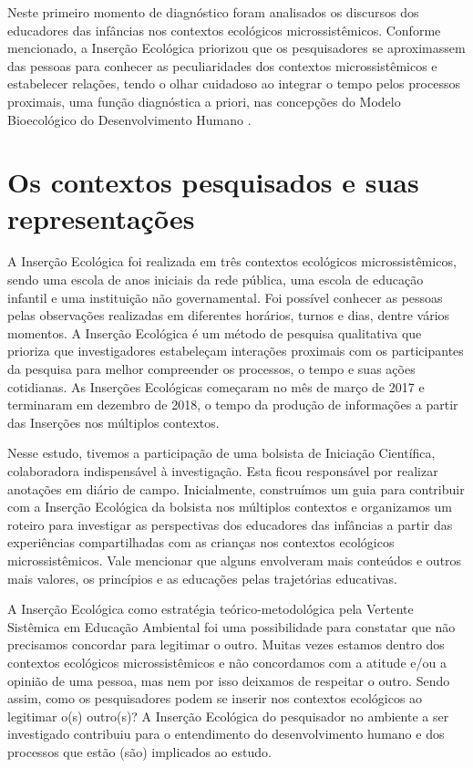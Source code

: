 \documentclass{textolivre-html}
\begin{document}
Neste primeiro momento de diagnóstico foram analisados os discursos dos educadores das infâncias nos contextos ecológicos microssistêmicos. Conforme mencionado, a Inserção Ecológica priorizou que os pesquisadores se aproximassem das pessoas para conhecer as peculiaridades dos contextos microssistêmicos e estabelecer relações, tendo o olhar cuidadoso ao integrar o tempo pelos processos proximais, uma função diagnóstica a priori, nas concepções do Modelo Bioecológico do Desenvolvimento Humano \cite{brofen2011}.



\section{Os contextos pesquisados e suas representações}\label{sec-contextos}
A Inserção Ecológica foi realizada em três contextos ecológicos microssistêmicos, sendo uma escola de anos iniciais da rede pública, uma escola de educação infantil e uma instituição não governamental. Foi possível conhecer as pessoas pelas observações realizadas em diferentes horários, turnos e dias, dentre vários momentos. A Inserção Ecológica \cite{piske2018c,koller2016,silveira2009} é um método de pesquisa qualitativa que prioriza que investigadores estabeleçam interações proximais com os participantes da pesquisa para melhor compreender os processos, o tempo e suas ações cotidianas. As Inserções Ecológicas começaram no mês de março de 2017 e terminaram em dezembro de 2018, o tempo da produção de informações a partir das Inserções nos múltiplos contextos.

Nesse estudo, tivemos a participação de uma bolsista de Iniciação Científica, colaboradora indispensável à investigação. Esta ficou responsável por realizar anotações em diário de campo. Inicialmente, construímos um guia para contribuir com a Inserção Ecológica da bolsista nos múltiplos contextos e organizamos um roteiro para investigar as perspectivas dos educadores das infâncias a partir das experiências compartilhadas com as crianças nos contextos ecológicos microssistêmicos. Vale mencionar que alguns envolveram mais conteúdos e outros mais valores, os princípios e as educações pelas trajetórias educativas.

A Inserção Ecológica como estratégia teórico-metodológica pela Vertente Sistêmica em Educação Ambiental foi uma possibilidade para constatar que não precisamos concordar para legitimar o outro. Muitas vezes estamos dentro dos contextos ecológicos microssistêmicos e não concordamos com a atitude e/ou a opinião de uma pessoa, mas nem por isso deixamos de respeitar o outro. Sendo assim, como os pesquisadores podem se inserir nos contextos ecológicos ao legitimar o(s) outro(s)? A Inserção Ecológica do pesquisador no ambiente a ser investigado contribuiu para o entendimento do desenvolvimento humano e dos processos que estão (são) implicados ao estudo. 
\end{document}

